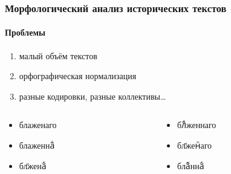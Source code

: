 \begin{frame}
  \frametitle{Морфологический анализ исторических текстов}
  \framesubtitle{Проблемы}

  \begin{enumerate}
    \item малый объём текстов
    \item<2-> орфографическая нормализация
    \item<3-> разные кодировки, разные коллективы\ldots
  \end{enumerate}

  \begin{columns}[c]
    \begin{column}{5cm}
      \begin{itemize}
        \item {\agio блаженаго}
        \item {\agio блаженна҇ⷢ}
        \item {\agio бл҃жена҇ⷢ}
      \end{itemize}
    \end{column}

    \begin{column}{5cm}
      \begin{itemize}
        \item {\agio бл҇ⷶженнаго}
        \item {\agio бл҃женⷩаго}
        \item {\agio бла҇ⷤнна҇ⷢ}
      \end{itemize}
    \end{column}
  \end{columns}
\end{frame}

